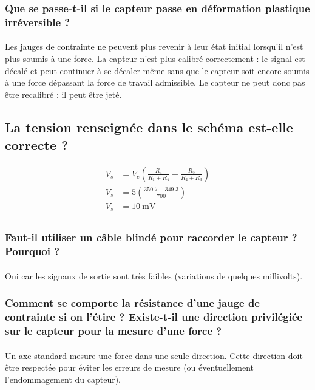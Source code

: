 \documentclass{article}
\begin{document}
\subsubsection{Que se passe-t-il si le capteur passe en déformation plastique irréversible ?}
\paragraph{}
Les jauges de contrainte ne peuvent plus revenir à leur état initial lorsqu'il n'est plus soumis à une force. La capteur n'est plus calibré correctement : le signal est décalé et peut continuer à se décaler même sans que le capteur soit encore soumis à une force dépassant la force de travail admissible. Le capteur ne peut donc pas être recalibré : il peut être jeté.

\subsection{La tension renseignée dans le schéma est-elle correcte ?}
\begin{align*}
    V_s &= V_e\left(\frac{R_4}{R_1 + R_4} - \frac{R_2}{R_2 + R_3}\right)\\
    V_s &= 5\left(\frac{350.7 - 349.3}{700}\right)\\
    V_s &= \SI{10}{\milli\volt}\\
\end{align*}

\subsubsection{Faut-il utiliser un câble blindé pour raccorder le capteur ? Pourquoi ?}
\paragraph{}
Oui car les signaux de sortie sont très faibles (variations de quelques millivolts).

\subsubsection{Comment se comporte la résistance d’une jauge de contrainte si on l’étire ? Existe-t-il une direction privilégiée sur le capteur pour la mesure d’une force ?}
\paragraph{}
Un axe standard mesure une force dans une seule direction. Cette direction doit être respectée pour éviter les erreurs de mesure (ou éventuellement l'endommagement du capteur).
\end{document}
